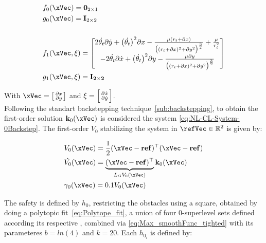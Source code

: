\begin{align}
  & f_0(\xVec) = \mathbf{0}_{2 \times 1}   \notag \\  
  & g_0(\xVec) = \mathbf{I}_{2 \times 2} \label{eq:orbital_0_dyn} \\ \notag \\
  & f_1(\xVec,\xi) = \begin{bmatrix}  2\dot{\theta_t}\partial\dot{y} + \bigl(\dot{\theta_t}\bigr)^2 \partial x - \frac{\mu(r_t + \partial x)}{\bigl((r_t+ \partial x)^2 + \partial y^2\bigr)^{\frac{3}{2}}} + \frac{\mu}{r_t^2}  \\ -2\dot{\theta_t}\partial\dot{x} + \bigl(\dot{\theta_t}\bigr)^2 \partial y - \frac{\mu \partial y}{\bigl((r_t + \partial x)^2 + \partial y^2\bigr)^{\frac{3}{2}}} \end{bmatrix} 
  \notag \\ & g_1(\xVec, \xi) = \mathbf{I_{2 \times 2}}\label{eq:orbital_1_dyn}
\end{align}

With \(\xVec = \bigl[\begin{smallmatrix} \partial x \\ \partial y \end{smallmatrix} \bigr]\) and \(\xi = \Bigl[\begin{smallmatrix} \partial \dot{x} \\ \partial \dot{y} \end{smallmatrix} \Bigr]\). \\

Following the standart backstepping technique~\ref{sub:backstepping}, to obtain the first-order solution \(\mathbf{k}_0(\xVec)\) is considered the system \ref{eq:NL-CL-System-0Backstep}. The first-order  \(V_0\) stabilizing the system in \(\refVec \in \mathbb{R}^2\) is given by:

\begin{subequations}
  \begin{align}
    &V_0(\xVec) = \frac{1}{2}(\xVec-\mathbf{ref})^{\top}(\xVec-\mathbf{ref}) \label{eq:V0_unicycle} \\
    &\dot{V_0}(\xVec) = \underbrace{(\xVec-\mathbf{ref})^{\top}}_{L_GV_0(\xVec)}\mathbf{k}_0(\xVec)  \label{eq:dot_V0_unicycle} \\
    &\gamma_0(\xVec)  = 0.1 V_0(\xVec) \label{eq:CLF_gamma0_unicycle}
  \end{align}
\label{eq:CLF0_unicycle}
\end{subequations}


The safety is defined by  \(h_0\), restricting the obstacles using a square, obtained by doing a polytopic fit~\ref{eq:Polytope_fit}, a union of four 0-superlevel sets defined according its respective , combined via \ref{eq:Max_smoothFunc_tighted} with its parameteres \(b = ln(4)\) and \(k = 20\). Each  \(h_{0_i}\) is defined by:

